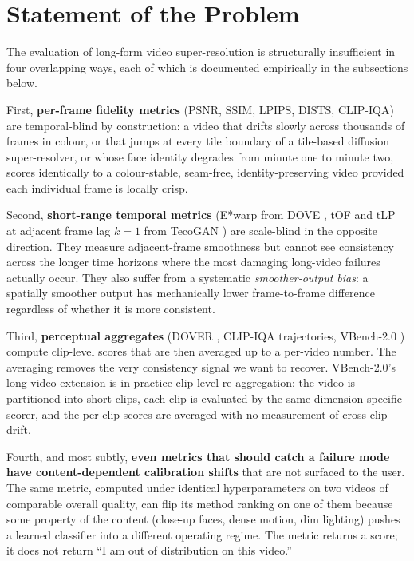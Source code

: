 \section{Statement of the Problem}
\label{sec:problem}

The evaluation of long-form video super-resolution is structurally insufficient in four
overlapping ways, each of which is documented empirically in the subsections below.

First, \textbf{per-frame fidelity metrics} (PSNR, SSIM, LPIPS, DISTS, CLIP-IQA) are
temporal-blind by construction: a video that drifts slowly across thousands of frames in
colour, or that jumps at every tile boundary of a tile-based diffusion super-resolver, or
whose face identity degrades from minute one to minute two, scores identically to a
colour-stable, seam-free, identity-preserving video provided each individual frame is
locally crisp.

Second, \textbf{short-range temporal metrics} (E*warp from DOVE \cite{yang_dove_2024}, tOF and
tLP at adjacent frame lag $k=1$ from TecoGAN \cite{chu_tecogan_2020}) are scale-blind in the
opposite
direction. They measure adjacent-frame smoothness but cannot see consistency across the
longer time horizons where the most damaging long-video failures actually occur. They
also suffer from a systematic \emph{smoother-output bias}: a spatially smoother output has
mechanically lower frame-to-frame difference regardless of whether it is more consistent.

Third, \textbf{perceptual aggregates} (DOVER \cite{wu_dover_2023}, CLIP-IQA trajectories,
VBench-2.0 \cite{huang_vbench2_2025}) compute clip-level scores that are then averaged up
to a per-video number. The averaging removes the very consistency signal we want to
recover. VBench-2.0's long-video extension is in practice clip-level re-aggregation: the
video is partitioned into short clips, each clip is evaluated by the same dimension-specific
scorer, and the per-clip scores are averaged with no measurement of cross-clip drift.

Fourth, and most subtly, \textbf{even metrics that should catch a failure mode have
content-dependent calibration shifts} that are not surfaced to the user. The same metric,
computed under identical hyperparameters on two videos of comparable overall quality, can
flip its method ranking on one of them because some property of the content (close-up faces,
dense motion, dim lighting) pushes a learned classifier into a different operating regime.
The metric returns a score; it does not return ``I am out of distribution on this video.''

